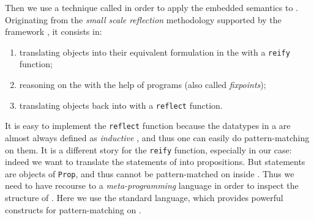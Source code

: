 \AP
Then we use a technique called  in order to
apply the embedded  semantics to  .
Originating from the \emph{small scale reflection} methodology supported by the
{\kl{\ssreflect}} framework \cite{SSR}, it consists in:
\begin{enumerate}
  \item translating  objects into their equivalent formulation in the
 with a \texttt{reify} function;
  \item reasoning on the  with the help of  programs
(also called \emph{fixpoints});
  \item translating objects back into  with a \texttt{reflect} function.
\end{enumerate}
\AP
It is easy to implement the \texttt{reflect} function because the datatypes in a
 are almost always defined as \emph{inductive} ,
and thus one can easily do pattern-matching on them. It is a different story for
the \texttt{reify} function, especially in our case: indeed we want to translate
the statements of   into  propositions. But
 statements are objects of  \texttt{Prop}, and thus cannot be
pattern-matched on inside . Thus we need to
have recourse to a \emph{meta-programming} language in order to inspect the
structure of  . Here we use the standard 
language, which provides powerful constructs for pattern-matching on
.


